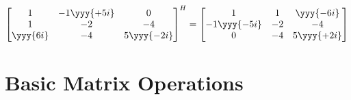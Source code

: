 \begin{itemize}
\begin{itemize}
\[    \begin{bmatrix}
    1 & -1\yyy{+5i} & 0 \\
    1 & -2 & -4 \\
   \yyy{ 6i} & -4 & 5\yyy{-2i}  
    \end{bmatrix}^H
    =
    \begin{bmatrix}
    1 & 1 & \yyy{-6i} \\
    -1\yyy{-5i} & -2 & -4 \\
    0 & -4 & 5\yyy{+2i} 
    \end{bmatrix}
    \]%
  \end{itemize}  
\end{itemize}

\section{Basic Matrix Operations}\label{Basic Matrix Operations}
